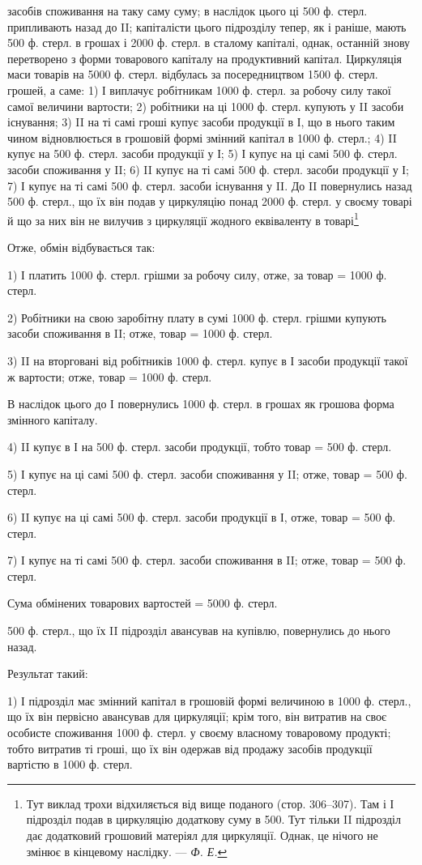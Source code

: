 \parcont{}  %
засобів споживання на таку саму суму; в наслідок цього ці 500 ф. стерл.
припливають назад до II; капіталісти цього підрозділу тепер, як і раніше,
мають 500 ф. стерл. в грошах і 2000 ф. стерл. в сталому капіталі,
однак, останній знову перетворено з форми товарового капіталу на продуктивний
капітал. Циркуляція маси товарів на 5000 ф. стерл. відбулась
за посередництвом 1500 ф. стерл. грошей, а саме: 1) І виплачує робітникам
1000 ф. стерл. за робочу силу такої самої величини вартости;
2) робітники на ці 1000 ф. стерл. купують у II засоби існування;
3) II на ті самі гроші купує засоби продукції в І, що в нього таким
чином відновлюється в грошовій формі змінний капітал в 1000 ф. стерл.;
4) II купує на 500 ф. стерл. засоби продукції у І;
5) І купує на ці самі 500 ф. стерл. засоби споживання у II;
6) II купує на ті самі 500 ф. стерл. засоби продукції у І;
7) І купує на ті самі 500 ф. стерл. засоби
існування у II. До II повернулись назад 500 ф. стерл., що їх він подав у
циркуляцію понад 2000 ф. стерл. у своєму товарі й що за них він не
вилучив з циркуляції жодного еквіваленту в товарі\footnote{
Тут виклад трохи відхиляється від вище поданого (стор. 306--307). Там і
І підрозділ подав в циркуляцію додаткову суму в 500. Тут тільки II підрозділ дає
додатковий грошовий матеріял для циркуляції. Однак, це нічого не змінює в
кінцевому наслідку. — \emph{Ф. Е.}}

Отже, обмін відбувається так:

1) І платить 1000 ф. стерл. грішми за робочу силу, отже, за товар = 1000 ф. стерл.

2) Робітники на свою заробітну плату в сумі 1000 ф. стерл. грішми
купують засоби споживання в II; отже, товар = 1000 ф. стерл.

3) II на вторговані від робітників 1000 ф. стерл. купує в І засоби
продукції такої ж вартости; отже, товар = 1000 ф. стерл.

В наслідок цього до І повернулись 1000 ф. стерл. в грошах як грошова
форма змінного капіталу.

4) II купує в І на 500 ф. стерл. засоби продукції, тобто товар =
500 ф. стерл.

5) І купує на ці самі 500 ф. стерл. засоби споживання у II; отже,
товар = 500 ф. стерл.

6) II купує на ці самі 500 ф. стерл. засоби продукції в І, отже,
товар = 500 ф. стерл.

7) І купує на ті самі 500 ф. стерл. засоби споживання в II; отже,
товар = 500 ф. стерл.

Сума обмінених товарових вартостей = 5000 ф. стерл.

500 ф. стерл., що їх II підрозділ авансував на купівлю, повернулись
до нього назад.

Результат такий:

1) І підрозділ має змінний капітал в грошовій формі величиною в 1000 ф.
стерл., що їх він первісно авансував для циркуляції; крім того, він витратив
на своє особисте споживання 1000 ф. стерл. у своєму власному
товаровому продукті; тобто витратив ті гроші, що їх він одержав від продажу
засобів продукції вартістю в 1000 ф. стерл.
